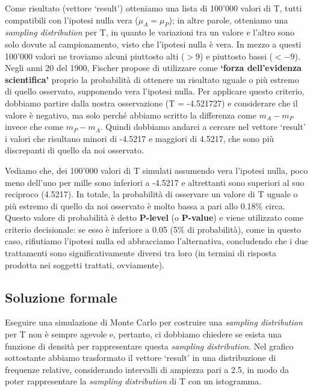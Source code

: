 \documentclass[a4paper,12pt,oneside]{book}
\begin{document}
Come risultato (vettore `result') otteniamo una lista di 100'000 valori di T, tutti compatibili con l'ipotesi nulla vera (\(\mu_A = \mu_P\)); in altre parole, otteniamo una \emph{sampling distribution} per T, in quanto le variazioni tra un valore e l'altro sono solo dovute al campionamento, visto che l'ipotesi nulla è vera. In mezzo a questi 100'000 valori ne troviamo alcuni piuttosto alti (\(> 9\)) e piuttosto bassi (\(< - 9\)). Negli anni 20 del 1900, Fischer propose di utilizzare come \textbf{`forza dell'evidenza scientifica'} proprio la probabilità di ottenere un risultato uguale o più estremo di quello osservato, supponendo vera l'ipotesi nulla. Per applicare questo criterio, dobbiamo partire dalla nostra osservazione (T = -4.521727) e considerare che il valore è negativo, ma solo perché abbiamo scritto la differenza come \(m_A - m_P\) invece che come \(m_P - m_A\). Quindi dobbiamo andarci a cercare nel vettore `result' i valori che risultano minori di -4.5217 e maggiori di 4.5217, che sono più discrepanti di quello da noi osservato.

Vediamo che, dei 100'000 valori di T simulati assumendo vera l'ipotesi nulla, poco meno dell'uno per mille sono inferiori a -4.5217 e altrettanti sono superiori al suo reciproco (4.5217). In totale, la probabilità di osservare un valore di T uguale o più estremo di quello da noi osservato è molto bassa a pari allo 0.18\% circa. Questo valore di probabilità è detto \textbf{P-level} (o \textbf{P-value}) e viene utilizzato come criterio decisionale: se esso è inferiore a 0.05 (5\% di probabilità), come in questo caso, rifiutiamo l'ipotesi nulla ed abbracciamo l'alternativa, concludendo che i due trattamenti sono significativamente diversi tra loro (in termini di risposta prodotta nei soggetti trattati, ovviamente).

\hypertarget{soluzione-formale}{%
\subsection{Soluzione formale}\label{soluzione-formale}}

Eseguire una simulazione di Monte Carlo per costruire una \emph{sampling distribution} per T non è sempre agevole e, pertanto, ci dobbiamo chiedere se esista una funzione di densità per rappresentare questa \emph{sampling distribution}. Nel grafico sottostante abbiamo trasformato il vettore `result' in una distribuzione di frequenze relative, considerando intervalli di ampiezza pari a 2.5, in modo da poter rappresentare la \emph{sampling distribution} di T con un istogramma.
\end{document}

